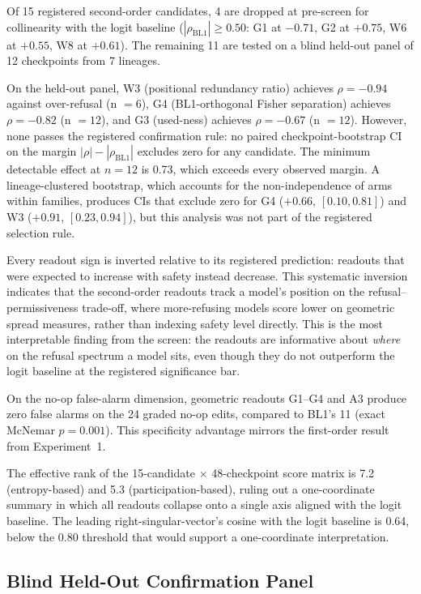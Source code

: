 \documentclass[11pt,letterpaper]{article}
\begin{document}
Of 15 registered second-order candidates, 4 are dropped at pre-screen for collinearity with the logit baseline ($|\rho_{\text{BL1}}| \geq 0.50$: G1 at $-0.71$, G2 at $+0.75$, W6 at $+0.55$, W8 at $+0.61$). The remaining 11 are tested on a blind held-out panel of 12 checkpoints from 7 lineages.

On the held-out panel, W3 (positional redundancy ratio) achieves $\rho = -0.94$ against over-refusal (n $= 6$), G4 (BL1-orthogonal Fisher separation) achieves $\rho = -0.82$ (n $= 12$), and G3 (used-ness) achieves $\rho = -0.67$ (n $= 12$). However, none passes the registered confirmation rule: no paired checkpoint-bootstrap CI on the margin $|\rho| - |\rho_{\text{BL1}}|$ excludes zero for any candidate. The minimum detectable effect at $n = 12$ is 0.73, which exceeds every observed margin. A lineage-clustered bootstrap, which accounts for the non-independence of arms within families, produces CIs that exclude zero for G4 ($+0.66$, $[0.10, 0.81]$) and W3 ($+0.91$, $[0.23, 0.94]$), but this analysis was not part of the registered selection rule.

Every readout sign is inverted relative to its registered prediction: readouts that were expected to increase with safety instead decrease. This systematic inversion indicates that the second-order readouts track a model's position on the refusal--permissiveness trade-off, where more-refusing models score lower on geometric spread measures, rather than indexing safety level directly. This is the most interpretable finding from the screen: the readouts are informative about \emph{where} on the refusal spectrum a model sits, even though they do not outperform the logit baseline at the registered significance bar.

On the no-op false-alarm dimension, geometric readouts G1--G4 and A3 produce zero false alarms on the 24 graded no-op edits, compared to BL1's 11 (exact McNemar $p = 0.001$). This specificity advantage mirrors the first-order result from Experiment~1.

The effective rank of the 15-candidate $\times$ 48-checkpoint score matrix is 7.2 (entropy-based) and 5.3 (participation-based), ruling out a one-coordinate summary in which all readouts collapse onto a single axis aligned with the logit baseline. The leading right-singular-vector's cosine with the logit baseline is 0.64, below the 0.80 threshold that would support a one-coordinate interpretation.


\subsection{Blind Held-Out Confirmation Panel}
\label{sec:results-heldout}
\end{document}
